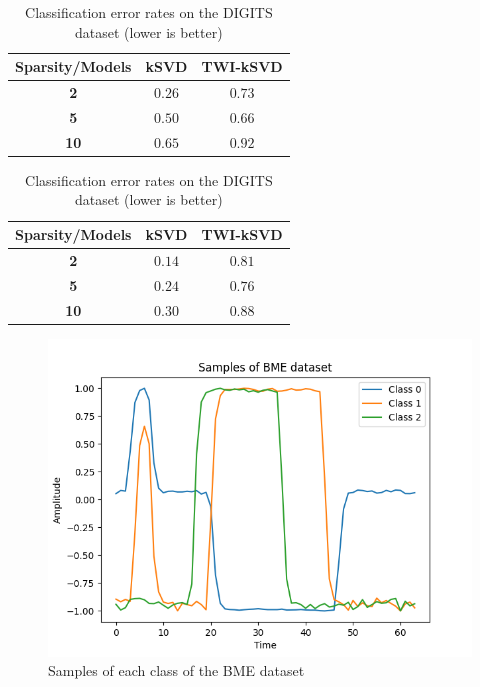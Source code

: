 \documentclass[10pt,twocolumn,letterpaper]{article}
\begin{document}
\begin{table}[!ht]
    \begin{minipage}{.55\linewidth}
      \centering
        \begin{tabular}{ccc}
            \toprule
            \textbf{Sparsity/Models} & \textbf{kSVD} & \textbf{TWI-kSVD} \\
            \midrule
            \textbf{2} & $\bm{0.26}$ & $0.73$ \\
            \textbf{5} & $0.50$ & $0.66$ \\
            \textbf{10} & $0.65$ & $0.92$ \\
            \bottomrule
        \end{tabular}
        \caption{Original classification strategy}
    \end{minipage}
    \begin{minipage}{.35\linewidth}
      \centering
        \begin{tabular}{ccc}
            \toprule
            \textbf{Sparsity/Models} & \textbf{kSVD} & \textbf{TWI-kSVD} \\
            \midrule
            \textbf{2} & $\bm{0.14}$ & $0.81$ \\
            \textbf{5} & $0.24$ & $0.76$ \\
            \textbf{10} & $0.30$ & $0.88$ \\
            \bottomrule
        \end{tabular}
        \caption{Our classification strategy}
    \end{minipage} 
    \caption{Classification error rates on the DIGITS dataset (lower is better)}
    \label{tab:classif_results_DIGITS}
\end{table}

\begin{figure}
    \centering
    \includegraphics[scale=0.7]{../../figures/BME_samples.png}
    \caption{Samples of each class of the BME dataset} \label{fig:BME_samples}
\end{figure}
\end{document}
